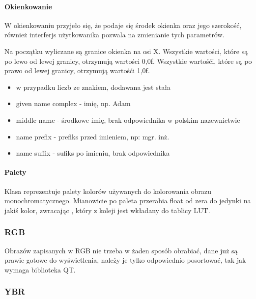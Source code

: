\paragraph{Okienkowanie}
W okienkowaniu przyjeło się, że podaje się środek okienka oraz jego szerokość, również interferjs użytkowanika pozwala na zmienianie tych parametrów.



Na początku wyliczane są granice okienka na osi X.
Wszystkie wartości, które są po lewo od lewej granicy, otrzymują wartości 0,0f.
Wszystkie wartośći, które są po prawo od lewej granicy, otrzymują wartośći 1,0f.

\begin{itemize}
    \item w przypadku liczb ze znakiem, dodawana jest stała 
    \item given name complex - imię, np. Adam
    \item middle name - środkowe imię, brak odpowiednika w polskim nazewnictwie
    \item name prefix - prefiks przed imieniem, np: mgr. inż.
    \item name suffix - sufiks po imieniu, brak odpowiednika
\end{itemize}


\paragraph{Palety} 
Klasa  reprezentuje palety kolorów używanych do kolorowania obrazu monochromatycznego.
Mianowicie po paleta przerabia float od zera do jedynki na jakiś kolor, zwracając , który z koleji jest wkładany do tablicy LUT.

\subsubsection{RGB}

Obrazów zapisanych w RGB nie trzeba w żaden sposób obrabiać, dane już są prawie gotowe do wyświetlenia, należy je tylko odpowiednio posortować, tak jak wymaga biblioteka QT.
\qtclass{}

\subsubsection{YBR}